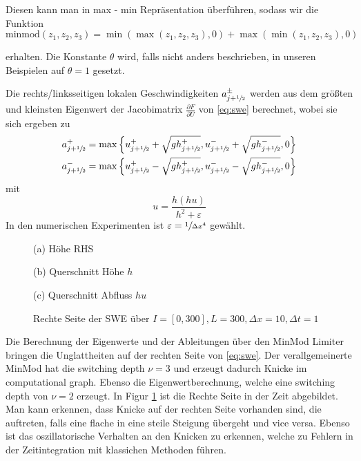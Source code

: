 Diesen kann man in max - min Repräsentation überführen, sodass wir die Funktion
 \begin{equation}
\text{minmod}(z_1,z_2,z_3) = \min(\max(z_1,z_2,z_3),0) + \max(\min(z_1,z_2,z_3),0)    
 \end{equation}

erhalten. Die Konstante $\theta$ wird, falls nicht anders beschrieben, in unseren Beispielen auf $\theta=1$ gesetzt.

Die rechts/linksseitigen lokalen Geschwindigkeiten $a^\pm_{j+\sfrac{1}{2}}$ werden aus dem größten und kleinsten Eigenwert der Jacobimatrix $\frac{\partial F}{\partial U}$ von \eqref{eq:swe} berechnet, wobei sie sich ergeben zu
\[
 \begin{aligned}
 a^+_{j+\sfrac{1}{2}} &= \max \left\lbrace u^+_{j+\sfrac{1}{2}} + \sqrt{gh^+_{j+\sfrac{1}{2}}},u^-_{j+\sfrac{1}{2}} + \sqrt{gh^-_{j+\sfrac{1}{2}}},0\right\rbrace\\
 a^-_{j+\sfrac{1}{2}} &= \max \left\lbrace u^+_{j+\sfrac{1}{2}} - \sqrt{gh^+_{j+\sfrac{1}{2}}},u^-_{j+\sfrac{1}{2}} - \sqrt{gh^-_{j+\sfrac{1}{2}}},0\right\rbrace
 \end{aligned}
\]
mit \begin{equation}
u=\frac{h(hu)}{h^2 + \varepsilon}
\label{eq:sweHuToU}
    \end{equation}
In den numerischen Experimenten ist $\varepsilon = \sfrac{1}{\Delta x^4}$ gewählt.
\begin{figure}
\footnotesize
\centering
\begin{minipage}[b]{\linewidth}

\caption*{(a) Höhe RHS}
\end{minipage}
\begin{minipage}[b]{0.49\linewidth}

\caption*{(b) Querschnitt Höhe $h$}
\end{minipage}
\begin{minipage}[b]{0.49\linewidth}

\caption*{(c) Querschnitt Abfluss $hu$}
\end{minipage}
\caption{Rechte Seite der SWE über $I=[0,300], L=300, \Delta x=10, \Delta t = 1$}
\label{fig:sweGrad}
\end{figure}


Die Berechnung der Eigenwerte und der Ableitungen über den MinMod Limiter bringen die Unglattheiten auf der rechten Seite von \eqref{eq:swe}.  Der verallgemeinerte MinMod hat die switching depth $\nu = 3$ und erzeugt dadurch Knicke im computational graph. Ebenso die Eigenwertberechnung, welche eine switching depth von $\nu = 2$ erzeugt. In Figur \ref{fig:sweGrad} ist die Rechte Seite in der Zeit abgebildet. Man kann erkennen, dass Knicke auf der rechten Seite vorhanden sind, die auftreten, falls eine flache in eine steile Steigung übergeht und vice versa. Ebenso ist das oszillatorische Verhalten an den Knicken zu erkennen, welche zu Fehlern in der Zeitintegration mit klassichen Methoden führen.

